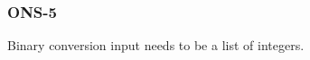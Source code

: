 \subsubsection{ONS-5}\label{sec:error_code_ons_5}

Binary conversion input needs to be a list of integers.


